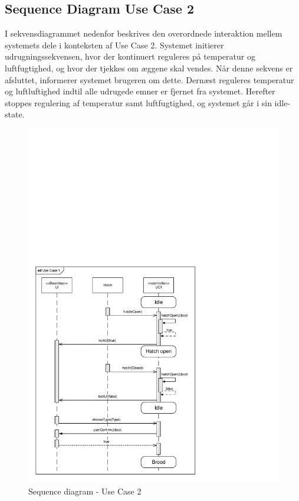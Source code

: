 
\subsection{Sequence Diagram Use Case 2}

I sekvensdiagrammet nedenfor beskrives den overordnede interaktion mellem systemets dele i konteksten af Use Case 2. Systemet initierer udrugningssekvensen, hvor der kontinuert reguleres på temperatur og luftfugtighed, og hvor der tjekkes om æggene skal vendes. Når denne sekvens er afsluttet, informerer systemet brugeren om dette. Dernæst reguleres temperatur og luftluftighed indtil alle udrugede emner er fjernet fra systemet. Herefter stoppes regulering af temperatur samt luftfugtighed, og systemet går i sin idle-state.

\begin{figure}[H]
\centering
\includegraphics[page=2,width=\linewidth,viewport=8mm 265mm 268mm 573mm]{./2_systemarkitektur/diagrammer/ArkitekturDiagrammer.pdf}
\caption[Diagram]{Sequence diagram - Use Case 2}
\label{fig:SystemStateDiagram}
\end{figure}
\clearpage
